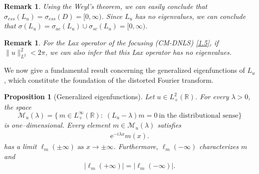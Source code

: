 \documentclass[10pt]{article}
\newtheorem{remark}[theorem]{Remark}
\newtheorem{proposition}[theorem]{Proposition}
\numberwithin{equation}{section}
\numberwithin{theorem}{section}
\begin{document}
\begin{remark}
Using the Weyl's theorem, we can easily conclude that $\sigma_{ess} (L_u) = \sigma_{ess}(D) = [0,\infty)$. Since $L_u$ has no eigenvalues, we can conclude that $\sigma(L_u)=  \sigma_{ac}(L_u) \cup \sigma_{sc}(L_u)= [0,\infty)$.
\end{remark}
\begin{remark}
For the Lax operator of the focusing (CM-DNLS) \eqref{1.5}, if $\|u\|_{L^2}^2<2\pi$, we can also infer that this Lax operator has no eigenvalues.
\end{remark}
\noindent We now give a fundamental result concerning the generalized eigenfunctions of $L_u$, which constitute the foundation of the distorted Fourier transform.
\begin{proposition}[Generalized eigenfunctions]
\label{prop:generalized_eigenfunctions}
Let $u\in L_{+}^{2}(\mathbb R)$. For every $\lambda >0$, the space
\[
\mathscr{M}_u(\lambda)
=\bigl\{\,m\in L^\infty_+(\mathbb{R}):\;(L_u-\lambda)m=0\ \text{in the distributional sense}\bigr\}
\]
is one–dimensional.  Every element $m\in\mathscr{M}_u(\lambda)$ satisfies
\begin{align*}
\mathrm{e}^{-i \lambda x} m(x).
\end{align*}
has a limit $\ell_m( \pm \infty) \text { as } x \rightarrow \pm \infty$. Furthermore, $\ell_m(-\infty)$ characterizes $m$ and
\begin{align*}
\left|\ell_m(+\infty)\right|=\left|\ell_m(-\infty)\right|.
\end{align*}
\end{proposition}
\end{document}
